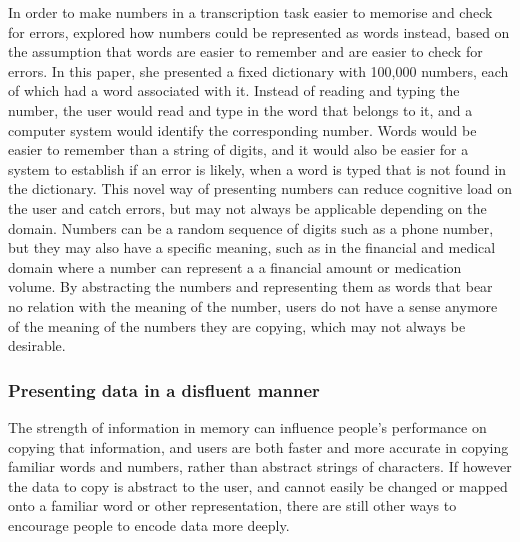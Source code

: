 In order to make numbers in a transcription task easier to memorise and check for errors, \citet{Sandnes2013} explored how numbers could be represented as words instead, based on the assumption that words are easier to remember and are easier to check for errors. 
In this paper, she presented a fixed dictionary with 100,000 numbers, each of which had a word associated with it. 
Instead of reading and typing the number, the user would read and type in the word that belongs to it, and a computer system would identify the corresponding number. 
Words would be easier to remember than a string of digits, and it would also be easier for a system to establish if an error is likely, when a word is typed that is not found in the dictionary. This novel way of presenting numbers can reduce cognitive load on the user and catch errors, but may not always be applicable depending on the domain. Numbers can be a random sequence of digits such as a phone number, but they may also have a specific meaning, such as in the financial and medical domain where a number can represent a a financial amount or medication volume.
By abstracting the numbers and representing them as words that bear no relation with the meaning of the number, users do not have a sense anymore of the meaning of the numbers they are copying, which may not always be desirable.

\subsubsection{Presenting data in a disfluent manner}
The strength of information in memory can influence people's performance on copying that information, and users are both faster and more accurate in copying familiar words and numbers, rather than abstract strings of characters. If however the data to copy is abstract to the user, and cannot easily be changed or mapped onto a familiar word or other representation, there are still other ways to encourage people to encode data more deeply. 

